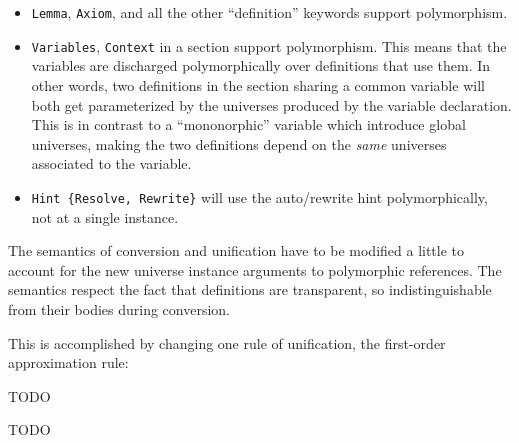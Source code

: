 \begin{itemize}
\item \texttt{Lemma}, \texttt{Axiom}, and all the other ``definition''
  keywords support polymorphism.
\item \texttt{Variables}, \texttt{Context} in a section support polymorphism.
  This means that the
  variables are discharged polymorphically over definitions that use
  them. In other words, two definitions in the section sharing a common
  variable will both get parameterized by the universes produced by the 
  variable declaration. This is in contrast to a ``mononorphic'' variable
  which introduce global universes, making the two definitions depend on
  the \emph{same} universes associated to the variable.
\item \texttt{Hint \{Resolve, Rewrite\}} will use the auto/rewrite hint
  polymorphically, not at a single instance.
\end{itemize}


The semantics of conversion and unification have to be modified a little
to account for the new universe instance arguments to polymorphic
references. The semantics respect the fact that definitions are
transparent, so indistinguishable from their bodies during conversion.

This is accomplished by changing one rule of unification, the
first-order approximation rule:


TODO




TODO


